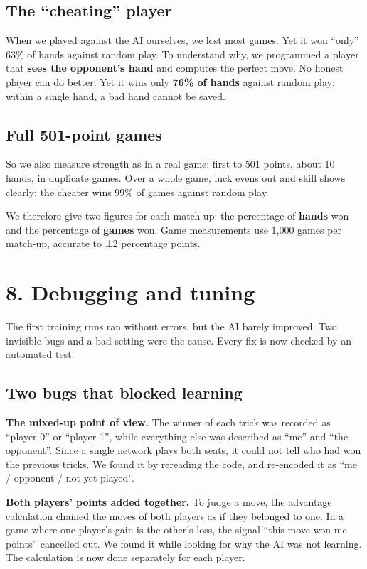 \subsection*{The ``cheating'' player}

When we played against the AI ourselves, we lost most games. Yet it won ``only'' 63\% of hands against random play. To understand why, we programmed a player that \textbf{sees the opponent's hand} and computes the perfect move. No honest player can do better. Yet it wins only \textbf{76\% of hands} against random play: within a single hand, a bad hand cannot be saved.

\subsection*{Full 501-point games}

So we also measure strength as in a real game: first to 501 points, about 10 hands, in duplicate games. Over a whole game, luck evens out and skill shows clearly: the cheater wins 99\% of games against random play.

We therefore give two figures for each match-up: the percentage of \textbf{hands} won and the percentage of \textbf{games} won. Game measurements use 1,000 games per match-up, accurate to ±2 percentage points.

\section*{8. Debugging and tuning}

The first training runs ran without errors, but the AI barely improved. Two invisible bugs and a bad setting were the cause. Every fix is now checked by an automated test.

\subsection*{Two bugs that blocked learning}

\textbf{The mixed-up point of view.} The winner of each trick was recorded as ``player 0'' or ``player 1'', while everything else was described as ``me'' and ``the opponent''. Since a single network plays both seats, it could not tell who had won the previous tricks. We found it by rereading the code, and re-encoded it as ``me / opponent / not yet played''.

\textbf{Both players' points added together.} To judge a move, the advantage calculation chained the moves of both players as if they belonged to one. In a game where one player's gain is the other's loss, the signal ``this move won me points'' cancelled out. We found it while looking for why the AI was not learning. The calculation is now done separately for each player.

